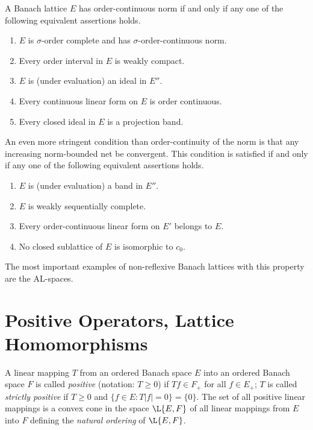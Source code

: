 A Banach lattice $ E $ has order-continuous norm if and only if any one of the following equivalent assertions holds.
\begin{enumerate}[\upshape (a)]
	\item 
	$ E $ is $ \sigma $-order complete and has $ \sigma $-order-continuous norm.

	\item 
	Every order interval in $ E $ is weakly compact.

	\item 
	$ E $ is (under evaluation) an ideal in $ E'' $.

	\item 
	Every continuous linear form on $ E $ is order continuous.

	\item 
	Every closed ideal in $ E $ is a projection band.

\end{enumerate}
An even more stringent condition than order-continuity of the norm is that any increasing norm-bounded net be convergent.
This condition is satisfied if and only if any one of the following equivalent assertions holds.
\begin{enumerate}[\upshape (a)]

    \item 
    $ E $ is (under evaluation) a band in $ E'' $.
    
    \item 
    $ E $ is weakly sequentially complete.
    
    \item 
    Every order-continuous linear form on $ E' $ belongs to $ E $.
    
    \item 
    No closed sublattice of\/ $ E $ is isomorphic to $ c_{0} $.

\end{enumerate}
The most important examples of non-reflexive Banach lattices with this property are the AL-spaces.
\section{Positive Operators, Lattice Homomorphisms}\label{sec:c1-6}%
%
%
%
A linear mapping $ T $ from an ordered Banach space $ E $ into an ordered Banach space $ F $ is called \emph{positive} (notation: $ T \geq 0 $) if\/ $ Tf \in F_{+} $ for all $ f \in E_{+} $; $ T $ is called \emph{strictly positive} if\/ $ T \geq 0 $ and $ \{f \in E \colon T|f| = 0\} = \{0\} $.
The set of all positive linear mappings is a convex cone in the space $ \L{E,F} $ of all linear mappings from $ E $ into $ F $ defining the \emph{natural ordering} of\/ $ \L{E,F} $.

